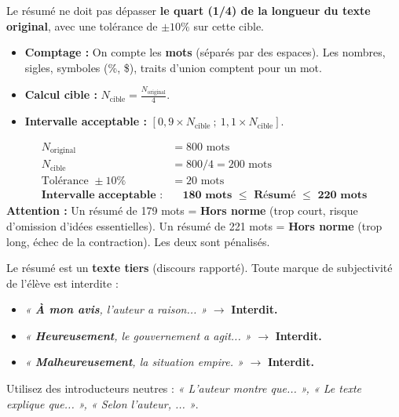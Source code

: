 \documentclass[11pt]{article}
\begin{document}
\begin{aretenir}
Le résumé ne doit pas dépasser \textbf{le quart (1/4) de la longueur du texte original}, avec une tolérance de \textbf{$\pm 10\%$} sur cette cible.
\begin{itemize}
\item \textbf{Comptage :} On compte les \textbf{mots} (séparés par des espaces). Les nombres, sigles, symboles (\%, \$), traits d'union comptent pour un mot.
\item \textbf{Calcul cible :} $N_{\text{cible}} = \frac{N_{\text{original}}}{4}$.
\item \textbf{Intervalle acceptable :} $\left[ 0,9 \times N_{\text{cible}} \ ; \ 1,1 \times N_{\text{cible}} \right]$.
\end{itemize}
\end{aretenir}

\begin{exemplebox}
\begin{align*}
N_{\text{original}} &= 800 \text{ mots} \\
N_{\text{cible}} &= 800 / 4 = 200 \text{ mots} \\
\text{Tolérance } \pm 10\% &= 20 \text{ mots} \\
\textbf{Intervalle acceptable :} &\quad \textbf{180 mots $\le$ Résumé $\le$ 220 mots}
\end{align*}
\textbf{Attention :} Un résumé de 179 mots = \textbf{Hors norme} (trop court, risque d'omission d'idées essentielles). Un résumé de 221 mots = \textbf{Hors norme} (trop long, échec de la contraction). Les deux sont pénalisés.
\end{exemplebox}

\begin{attention}
Le résumé est un \textbf{texte tiers} (discours rapporté). Toute marque de subjectivité de l'élève est interdite :
\begin{itemize}
\item \textit{« \textbf{À mon avis}, l'auteur a raison... »} $\rightarrow$ \textbf{Interdit.}
\item \textit{« \textbf{Heureusement}, le gouvernement a agit... »} $\rightarrow$ \textbf{Interdit.}
\item \textit{« \textbf{Malheureusement}, la situation empire. »} $\rightarrow$ \textbf{Interdit.}
\end{itemize}
Utilisez des introducteurs neutres : \textit{« L'auteur montre que... », « Le texte explique que... », « Selon l'auteur, ... »}.
\end{attention}
\end{document}
